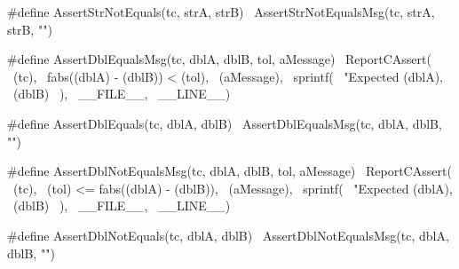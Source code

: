 #define AssertStrNotEquals(tc, strA, strB) \
  AssertStrNotEqualsMsg(tc, strA, strB, "")
\stopCHeader

\stopTestSuite

\startTestSuite[assertDblEquals]

\startCHeader
#define AssertDblEqualsMsg(tc, dblA, dblB, tol, aMessage)     \
  ReportCAssert(                                              \
    (tc),                                                     \
    fabs((dblA) - (dblB)) < (tol),                            \
    (aMessage),                                               \
    sprintf(                                                  \
      "Expected %
      (dblA),                                                 \
      (dblB)                                                  \
    ),                                                        \
    __FILE__,                                                 \
    __LINE__)

#define AssertDblEquals(tc, dblA, dblB) \
  AssertDblEqualsMsg(tc, dblA, dblB, "")
\stopCHeader

\stopTestSuite

\startTestSuite[assertDblNotEqals]

\startCHeader
#define AssertDblNotEqualsMsg(tc, dblA, dblB, tol, aMessage)      \
  ReportCAssert(                                                  \
    (tc),                                                         \
    (tol) <= fabs((dblA) - (dblB)),                               \
    (aMessage),                                                   \
    sprintf(                                                      \
      "Expected %
      (dblA),                                                     \
      (dblB)                                                      \
    ),                                                            \
    __FILE__,                                                     \
    __LINE__)

#define AssertDblNotEquals(tc, dblA, dblB) \
  AssertDblNotEqualsMsg(tc, dblA, dblB, "")
\stopCHeader

\stopTestSuite
